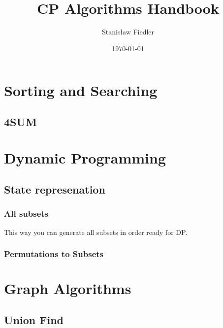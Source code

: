 \documentclass[13pt]{article}
\title{CP Algorithms Handbook}
\author{Stanisław Fiedler}
\date{\today}
\begin{document}
\maketitle
\tableofcontents
\pagebreak

\tableofcontents
\pagebreak

\section{Sorting and Searching}

\subsection{4SUM}

\section{Dynamic Programming}

\subsection{State represenation}\label{sub:state_represenation} %

\subsubsection{All subsets}\label{ssub:all_subsets} %
This way you can generate all subsets in order ready for DP.


\subsubsection{Permutations to Subsets}\label{ssub:permutations_to_subsets} %



\section{Graph Algorithms}

\subsection{Union Find}\label{sub:union_find} %

\end{document}
